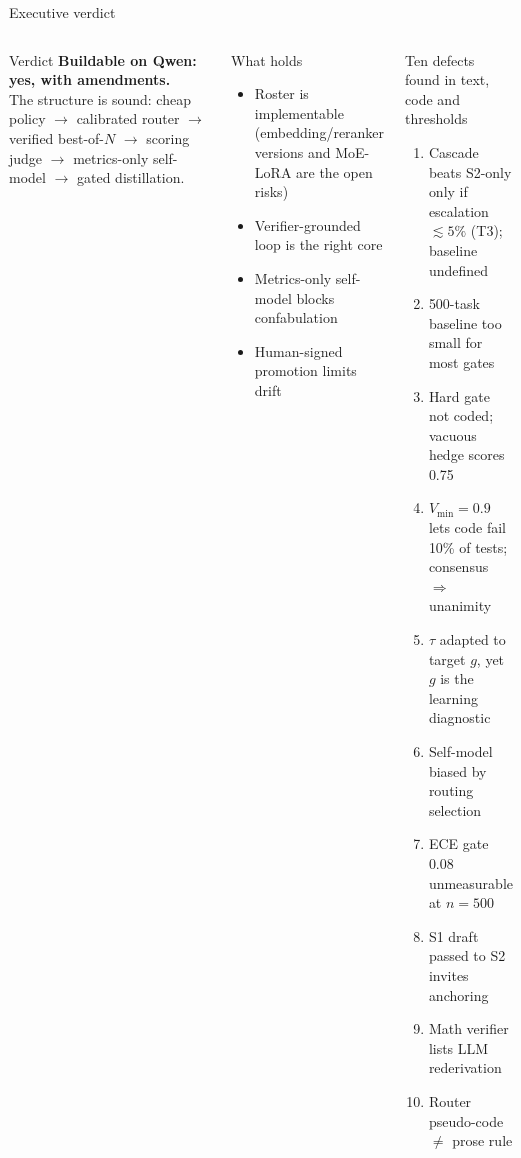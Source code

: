 \documentclass[aspectratio=169,10pt]{beamer}
\begin{document}
\begin{frame}{Executive verdict}
\begin{columns}[T]
\begin{block}{Verdict}
\textbf{Buildable on Qwen: yes, with amendments.}\\
The structure is sound: cheap policy $\to$ calibrated router $\to$ verified best-of-$N$ $\to$ scoring judge $\to$ metrics-only self-model $\to$ gated distillation.
\end{block}
\begin{exampleblock}{What holds}
\small
\begin{itemize}
\item Roster is implementable (embedding/reranker versions and MoE-LoRA are the open risks)
\item Verifier-grounded loop is the right core
\item Metrics-only self-model blocks confabulation
\item Human-signed promotion limits drift
\end{itemize}
\end{exampleblock}
\begin{alertblock}{Ten defects found in text, code and thresholds}
\scriptsize
\begin{enumerate}
\item Cascade beats S2-only only if escalation $\lesssim 5\%$ (T3); baseline undefined
\item 500-task baseline too small for most gates
\item Hard gate not coded; vacuous hedge scores 0.75
\item $V_{\min}{=}0.9$ lets code fail 10\% of tests; consensus $\Rightarrow$ unanimity
\item $\tau$ adapted to target $g$, yet $g$ is the learning diagnostic
\item Self-model biased by routing selection
\item ECE gate 0.08 unmeasurable at $n{=}500$
\item S1 draft passed to S2 invites anchoring
\item Math verifier lists LLM rederivation
\item Router pseudo-code $\neq$ prose rule
\end{enumerate}
\end{alertblock}
\end{columns}
\end{frame}
\end{document}
